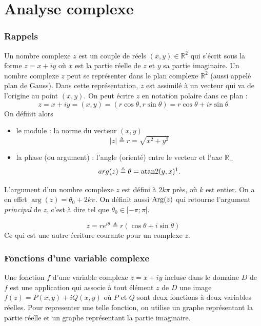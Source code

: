 
\part{Analyse complexe}
\section{Rappels}
\begin{mydef}
	Un nombre complexe $z$ est un couple de réels $(x,y) \in \mathbb{R}^2$ qui s'écrit
	sous la forme $z=x+iy$ où $x$ est la partie réelle de $z$ et $y$
	sa partie imaginaire. Un nombre complexe $z$ peut se représenter
	dans le plan complexe $\mathbb{R}^2$ (aussi appelé plan de Gauss).
	Dans cette représentation, $z$ est assimilé à un vecteur qui va de
	l'origine au point $(x,y)$. On peut écrire $z$ en notation polaire
	dans ce plan :
	\[z = x+iy = (x,y) = (r\cos\theta, r\sin\theta) = r\cos\theta + i r\sin\theta\]
	On définit alors
	\begin{itemize}
	    \item le module : la norme du vecteur $(x,y)$
	    \[|z| \triangleq r = \sqrt{x^2+y^2}\]
	    \item la phase (ou argument) : l'angle (orienté) entre le vecteur
	    et l'axe $\mathbb{R}_+$
	    \[arg(z) \triangleq \theta = \Atan(y, x)\footnotemark.\]
	\end{itemize}

\end{mydef}

\begin{mydef}
	L'argument d'un nombre complexe $z$ est défini à $2k\pi$ près, où
	$k$ est entier. On a en effet $\arg(z) = \theta_0 + 2k\pi$. On définit aussi
	$\operatorname{Arg}(z)$ qui retourne l'argument \textit{principal} de $z$,
	c'est à dire tel que $\theta_0 \in [-\pi;\pi[$.
\end{mydef}

\begin{mydef}
	\[z = re^{i\theta} \triangleq r(\cos\theta+i\sin\theta)\]
	Ce qui est une autre écriture courante pour un complexe $z$.
\end{mydef}

\section{Fonctions d'une variable complexe}
\begin{mydef}
	Une fonction $f$ d'une variable complexe $z=x+iy$ incluse dans
	le domaine $D$ de $f$ est une application qui associe à tout
	élément $z$ de $D$ une image $f(z) = P(x,y) + iQ(x,y)$ où
	$P$ et $Q$ sont deux fonctions à deux variables réelles.
	Pour representer une telle fonction, on utilise un
	graphe représentant la partie réelle et un graphe
	représentant la partie imaginaire.
\end{mydef}

